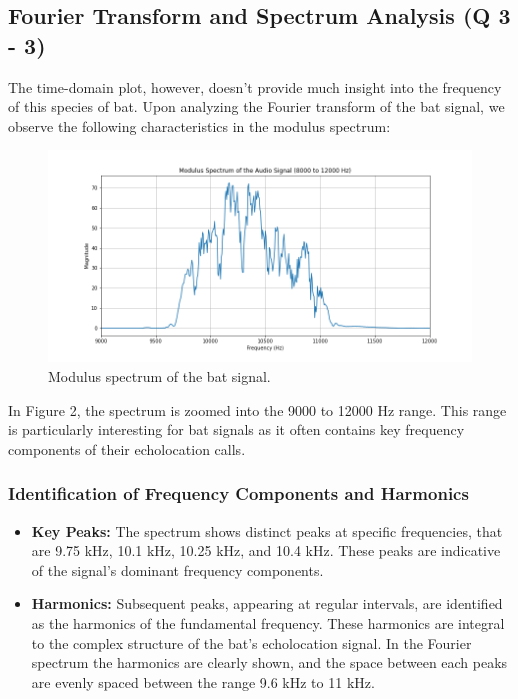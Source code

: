 \documentclass[12pt]{article}
\begin{document}
\subsection{Fourier Transform and Spectrum Analysis (Q 3 - 3)}
The time-domain plot, however, doesn't provide much insight into the frequency of this species of bat. Upon analyzing the Fourier transform of the bat signal, we observe the following characteristics in the modulus spectrum:

\begin{figure}[h]
\centering
\includegraphics[width=1\textwidth]{modulus_spectrum.png}
\caption{Modulus spectrum of the bat signal.}
\end{figure}

In Figure 2, the spectrum is zoomed into the 9000 to 12000 Hz range. This range is particularly interesting for bat signals as it often contains key frequency components of their echolocation calls.

\subsubsection*{Identification of Frequency Components and Harmonics}
\begin{itemize}
    \item \textbf{Key Peaks:} The spectrum shows distinct peaks at specific frequencies, that are 9.75 kHz, 10.1 kHz, 10.25 kHz, and 10.4 kHz. These peaks are indicative of the signal's dominant frequency components.
        
    \item \textbf{Harmonics:} Subsequent peaks, appearing at regular intervals, are identified as the harmonics of the fundamental frequency. These harmonics are integral to the complex structure of the bat's echolocation signal. In the Fourier spectrum the harmonics are clearly shown, and the space between each peaks are evenly spaced between the range 9.6 kHz to 11 kHz.
\end{itemize}
\end{document}

